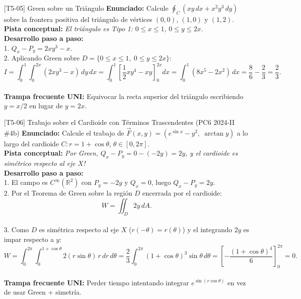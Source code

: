 \documentclass[11pt,a4paper]{article}
\begin{document}
\begin{ejerciciobox}{[T5-05] Green sobre un Triángulo}
\textbf{Enunciado:} Calcule $\oint_C (xy\,dx + x^2 y^3\,dy)$ sobre la frontera positiva del triángulo de vértices $(0,0)$, $(1,0)$ y $(1,2)$.\\[0.2cm]
\textbf{Pista conceptual:} \emph{El triángulo es Tipo 1: $0 \le x \le 1$, $0 \le y \le 2x$.}\\[0.2cm]
\textbf{Desarrollo paso a paso:}\\
1. $Q_x - P_y = 2xy^3 - x$.\\
2. Aplicando Green sobre $D = \{0 \le x \le 1,\; 0 \le y \le 2x\}$:\\
$$I = \int_0^1 \int_0^{2x} (2xy^3 - x)\,dy\,dx = \int_0^1 \left[\frac{1}{2}xy^4 - xy\right]_0^{2x} dx = \int_0^1 (8x^5 - 2x^2)\,dx = \frac{8}{6} - \frac{2}{3} = \frac{2}{3}.$$\\[0.2cm]
\textbf{Trampa frecuente UNI:} Equivocar la recta superior del triángulo escribiendo $y = x/2$ en lugar de $y = 2x$.
\end{ejerciciobox}

\begin{ejerciciobox}{[T5-06] Trabajo sobre el Cardioide con Términos Trascendentes (PC6 2024-II \#4b)}
\textbf{Enunciado:} Calcule el trabajo de $\vec{F}(x,y) = (e^{\sin x} - y^2,\; \arctan y)$ a lo largo del cardioide $C: r = 1 + \cos\theta$, $\theta \in [0, 2\pi]$.\\[0.2cm]
\textbf{Pista conceptual:} \emph{Por Green, $Q_x - P_y = 0 - (-2y) = 2y$, y el cardioide es simétrico respecto al eje $X$!}\\[0.2cm]
\textbf{Desarrollo paso a paso:}\\
1. El campo es $C^\infty(\mathbb{R}^2)$ con $P_y = -2y$ y $Q_x = 0$, luego $Q_x - P_y = 2y$.\\
2. Por el Teorema de Green sobre la región $D$ encerrada por el cardioide:\\
$$W = \iint_D 2y\,dA.$$\\
3. Como $D$ es simétrica respecto al eje $X$ ($r(-\theta) = r(\theta)$) y el integrando $2y$ es impar respecto a $y$:\\
$$W = \int_0^{2\pi} \int_0^{1+\cos\theta} 2(r\sin\theta)\,r\,dr\,d\theta = \frac{2}{3}\int_0^{2\pi} (1+\cos\theta)^3\sin\theta\,d\theta = \left[-\frac{(1+\cos\theta)^4}{6}\right]_0^{2\pi} = 0.$$\\[0.2cm]
\textbf{Trampa frecuente UNI:} Perder tiempo intentando integrar $e^{\sin(r\cos\theta)}$ en vez de usar Green + simetría.
\end{ejerciciobox}
\end{document}
